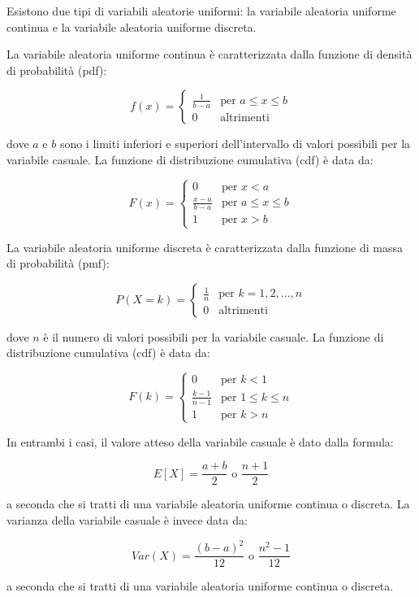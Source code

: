 Esistono due tipi di variabili aleatorie uniformi: la variabile aleatoria uniforme continua e la variabile aleatoria uniforme discreta.

La variabile aleatoria uniforme continua è caratterizzata dalla funzione di densità di probabilità (pdf):

$$
f(x) = \begin{cases}
\frac{1}{b-a} & \text{per } a \leq x \leq b \\
0 & \text{altrimenti}
\end{cases}
$$

dove $a$ e $b$ sono i limiti inferiori e superiori dell'intervallo di valori possibili per la variabile casuale. La funzione di distribuzione cumulativa (cdf) è data da:

$$
F(x) = \begin{cases}
0 & \text{per } x < a \\
\frac{x-a}{b-a} & \text{per } a \leq x \leq b \\
1 & \text{per } x > b
\end{cases}
$$

La variabile aleatoria uniforme discreta è caratterizzata dalla funzione di massa di probabilità (pmf):

$$
P(X=k) = \begin{cases}
\frac{1}{n} & \text{per } k=1,2,\ldots,n \\
0 & \text{altrimenti}
\end{cases}
$$

dove $n$ è il numero di valori possibili per la variabile casuale. La funzione di distribuzione cumulativa (cdf) è data da:

$$
F(k) = \begin{cases}
0 & \text{per } k < 1 \\
\frac{k-1}{n-1} & \text{per } 1 \leq k \leq n \\
1 & \text{per } k > n
\end{cases}
$$

In entrambi i casi, il valore atteso della variabile casuale è dato dalla formula:

$$
E[X] = \frac{a+b}{2} \text{ o } \frac{n+1}{2}
$$

a seconda che si tratti di una variabile aleatoria uniforme continua o discreta. La varianza della variabile casuale è invece data da:

$$
Var(X) = \frac{(b-a)^2}{12} \text{ o } \frac{n^2-1}{12}
$$

a seconda che si tratti di una variabile aleatoria uniforme continua o discreta.


